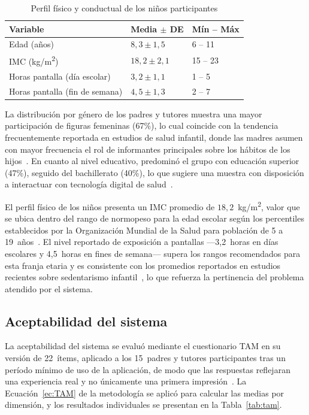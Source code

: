 				\begin{table}[H]
					\centering\small
					\caption{Perfil físico y conductual de los niños participantes}
					\label{tab:perfil_ninos}
					\begin{tabular}{p{5.5cm}p{3cm}p{3cm}}
						\hline
						\textbf{Variable} & \textbf{Media $\pm$ DE} & \textbf{Mín -- Máx}\\
						\hline
						Edad (años)                        & $8{,}3 \pm 1{,}5$ & 6 -- 11  \\
						IMC (kg/m\textsuperscript{2})      & $18{,}2 \pm 2{,}1$ & 15 -- 23 \\
						Horas pantalla (día escolar)       & $3{,}2 \pm 1{,}1$ & 1 -- 5   \\
						Horas pantalla (fin de semana)     & $4{,}5 \pm 1{,}3$ & 2 -- 7   \\
						\hline
					\end{tabular}
				\end{table}
				\tblnote
				
				La distribución por género de los padres y tutores muestra una mayor participación de figuras femeninas (67\%), lo cual coincide con la tendencia frecuentemente reportada en estudios de salud infantil, donde las madres asumen con mayor frecuencia el rol de informantes principales sobre los hábitos de los hijos~\cite{Yao2015}. En cuanto al nivel educativo, predominó el grupo con educación superior (47\%), seguido del bachillerato (40\%), lo que sugiere una muestra con disposición a interactuar con tecnología digital de salud~\cite{Venkatesh2003}.
				
				El perfil físico de los niños presenta un IMC promedio de $18{,}2$~kg/m\textsuperscript{2}, valor que se ubica dentro del rango de normopeso para la edad escolar según los percentiles establecidos por la Organización Mundial de la Salud para población de 5 a 19~años~\cite{Bull2020}. El nivel reportado de exposición a pantallas ---3{,}2~horas en días escolares y 4{,}5~horas en fines de semana--- supera los rangos recomendados para esta franja etaria y es consistente con los promedios reportados en estudios recientes sobre sedentarismo infantil~\cite{Musa2022,Guthold2020}, lo que refuerza la pertinencia del problema atendido por el sistema.
			
			\subsection{Aceptabilidad del sistema}
				La aceptabilidad del sistema se evaluó mediante el cuestionario TAM en su versión de 22~ítems, aplicado a los 15~padres y tutores participantes tras un período mínimo de uso de la aplicación, de modo que las respuestas reflejaran una experiencia real y no únicamente una primera impresión~\cite{Davis1989,Venkatesh2003}. La Ecuación~\eqref{ec:TAM} de la metodología se aplicó para calcular las medias por dimensión, y los resultados individuales se presentan en la Tabla~\ref{tab:tam}.
				
